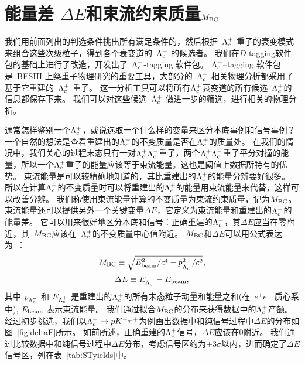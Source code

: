 \section{能量差 $\Delta{}E$和束流约束质量$M_{\rm BC}$}

我们用前面列出的判选条件挑出所有满足条件的\basic，然后根据~$\Lambda_{c}^{+}$ 重子的衰变模式来组合这些次级粒子，得到各个衰变道的~$\Lambda_{c}^{+}$ 的候选者。
我们在$D$-tagging软件包的基础上进行了改造，开发出了~$\Lambda_{c}^{+}$-tagging 软件包。
$\Lambda_{c}^{+}$--tagging 软件包是~BESIII 上粲重子物理研究的重要工具，大部分的~$\Lambda_{c}^{+}$ 相关物理分析都采用了基于它重建的~$\Lambda_{c}^{+}$ 重子。
这一分析工具可以将所有$\Lambda_{c}^{+}$衰变道的所有候选~$\Lambda_{c}^{+}$的信息都保存下来。
我们可以对这些候选~$\Lambda_{c}^{+}$ 做进一步的筛选，进行相关的物理分析。


通常怎样鉴别一个$\Lambda_{c}^{+}$，或说选取一个什么样的变量来区分本底事例和信号事例？
一个自然的想法是查看重建出的$\Lambda_{c}^{+}$的不变质量是否在$\Lambda_{c}^{+}$的质量处。
在我们的情况中，我们关心的过程末态只有一对$\Lambda_{c}^{+}\overline{\Lambda}{}_{c}^{-}$重子，两个$\Lambda_{c}^{+}\overline{\Lambda}{}_{c}^{-}$重子平分对撞的能量，所以一个$\Lambda_{c}^{+}$重子的能量应该等于束流能量。这也是阈值上数据所特有的优势。
束流能量是可以较精确地知道的，其比重建出的$\Lambda_{c}^{+}$的能量分辨要好很多。
所以在计算$\Lambda_{c}^{+}$的不变质量时可以将重建出的$\Lambda_{c}^{+}$的能量用束流能量来代替，这样可以改善分辨。
我们称使用束流能量计算的不变质量为束流约束质量，记为$M_{\rm BC}$。
束流能量还可以提供另外一个关键变量$\Delta E$，它定义为束流能量和重建出的$\Lambda_{c}^{+}$的能量差。
它可以用来很好地区分本底和信号：正确重建的$\Lambda_{c}^{+}$，其$\Delta E$应当在零附近，其~$M_{\rm BC}$应该在~$\Lambda_{c}^{+}$的不变质量中心值附近。
$M_{\rm BC}$和$\Delta E$可以用公式表达为~\cite{CLEO_phase1,CLEO_phase2}：
\begin{equation}
M_{\rm BC} \equiv \sqrt{E_{\rm beam}^{2}/c^{4}-p_{\Lambda_{c}^{+}}^{2}/c^{2}},
\end{equation}
\begin{equation}
\Delta E\equiv E_{\Lambda_{c}^{+}}-E_{\rm beam},
\end{equation}
其中 $p_{\Lambda_{c}^{+}}$ 和 $E_{\Lambda_{c}^{+}}$ 是重建出的$\Lambda_{c}^{+}$的所有末态粒子动量和能量之和(在~$e^{+}e^{-}$ 质心系中), $E_{\rm beam}$ 表示束流能量。
我们通过拟合$M_{\rm BC}$的分布来获得数据中的$\Lambda_{c}^{+}$产额。
经过初步挑选，我们以$\Lambda_{c}^{+}\rightarrow pK^{-}\pi^+$为例画出数据中和纯信号过程中$\Delta E$的分布如图~\ref{fig:deltaE}所示。
如前所述，正确重建的$\Lambda_{c}^{+}$信号，$\Delta E$应该在0附近。
我们通过比较数据中和纯信号过程中$\Delta E$分布，考虑信号区约为$\pm$3$\sigma$以内，进而确定了$\Delta E$信号区，列在表~\ref{tab:STyields}中。

